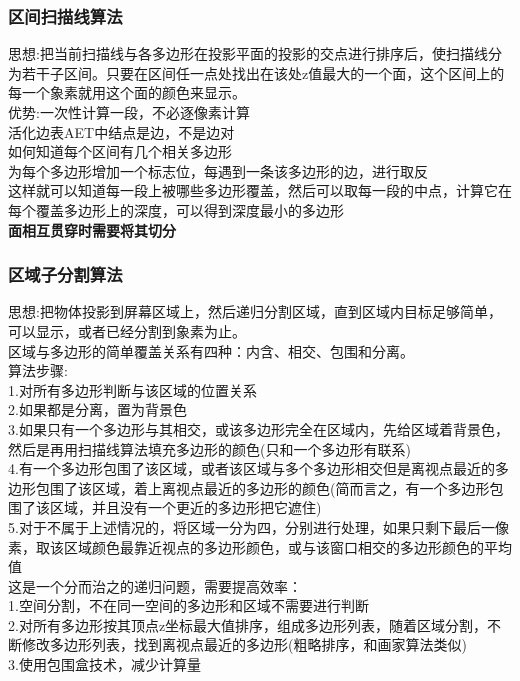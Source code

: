 \documentclass{article}
\begin{document}
\begin{CJK}{UTF8}{gbsn}
	\subsubsection{区间扫描线算法}
	思想:把当前扫描线与各多边形在投影平面的投影的交点进行排序后，使扫描线分为若干子区间。只要在区间任一点处找出在该处z值最大的一个面，这个区间上的每一个象素就用这个面的颜色来显示。\\
	优势:一次性计算一段，不必逐像素计算\\
	活化边表AET中结点是边，不是边对\\
	如何知道每个区间有几个相关多边形\\
	为每个多边形增加一个标志位，每遇到一条该多边形的边，进行取反\\
	这样就可以知道每一段上被哪些多边形覆盖，然后可以取每一段的中点，计算它在每个覆盖多边形上的深度，可以得到深度最小的多边形\\
	\textbf{面相互贯穿时需要将其切分}\\
	\subsubsection{区域子分割算法}
	思想:把物体投影到屏幕区域上，然后递归分割区域，直到区域内目标足够简单，可以显示，或者已经分割到象素为止。\\
	区域与多边形的简单覆盖关系有四种：内含、相交、包围和分离。\\
	算法步骤:\\
	1.对所有多边形判断与该区域的位置关系\\
	2.如果都是分离，置为背景色\\
	3.如果只有一个多边形与其相交，或该多边形完全在区域内，先给区域着背景色，然后是再用扫描线算法填充多边形的颜色(只和一个多边形有联系)\\
	4.有一个多边形包围了该区域，或者该区域与多个多边形相交但是离视点最近的多边形包围了该区域，着上离视点最近的多边形的颜色(简而言之，有一个多边形包围了该区域，并且没有一个更近的多边形把它遮住)\\
	5.对于不属于上述情况的，将区域一分为四，分别进行处理，如果只剩下最后一像素，取该区域颜色最靠近视点的多边形颜色，或与该窗口相交的多边形颜色的平均值\\
	这是一个分而治之的递归问题，需要提高效率：\\
	1.空间分割，不在同一空间的多边形和区域不需要进行判断\\
	2.对所有多边形按其顶点z坐标最大值排序，组成多边形列表，随着区域分割，不断修改多边形列表，找到离视点最近的多边形(粗略排序，和画家算法类似)\\
	3.使用包围盒技术，减少计算量\\

\end{CJK}
\end{document}
